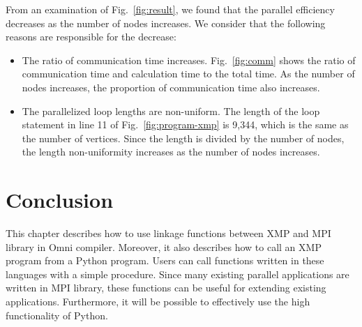 \documentclass[graybox]{svmult}
\begin{document}
From an examination of Fig.~\ref{fig:result}, we found that the parallel efficiency decreases as the number of nodes increases. 
We consider that the following reasons are responsible for the decrease:

\begin{itemize}
\item The ratio of communication time increases. 
Fig.~\ref{fig:comm} shows the ratio of communication time and calculation time to the total time. 
As the number of nodes increases, the proportion of communication time also increases.
\item The parallelized loop lengths are non-uniform. 
The length of the loop statement in line 11 of Fig.~\ref{fig:program-xmp} is 9,344, 
which is the same as the number of vertices. 
Since the length is divided by the number of nodes, 
the length non-uniformity increases as the number of nodes increases.
\end{itemize}

\section{Conclusion}
This chapter describes how to use  linkage functions between XMP and MPI library in Omni compiler. 
Moreover, it  also describes how to call  an XMP program from a Python program.
Users can call functions written in these languages with a simple procedure.
Since many existing parallel applications are written in MPI library, these functions can be useful for extending existing applications.
Furthermore, it will be possible to effectively use the high functionality of Python.


\end{document}
